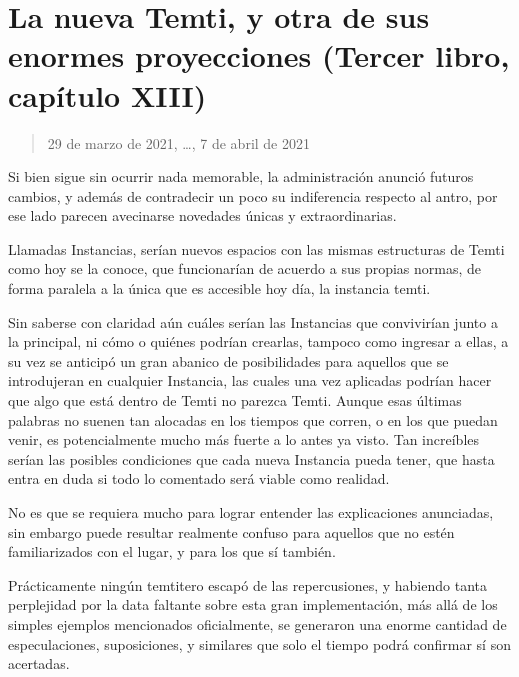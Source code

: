 \documentclass[
]{book}
\begin{document}
\hypertarget{la-nueva-temti-y-otra-de-sus-enormes-proyecciones-tercer-libro-capuxedtulo-xiii}{%
\section{La nueva Temti, y otra de sus enormes proyecciones (Tercer libro, capítulo XIII)}\label{la-nueva-temti-y-otra-de-sus-enormes-proyecciones-tercer-libro-capuxedtulo-xiii}}

\begin{quote}
29 de marzo de 2021, \ldots, 7 de abril de 2021
\end{quote}

Si bien sigue sin ocurrir nada memorable, la administración anunció futuros cambios, y además de contradecir un poco su indiferencia respecto al antro, por ese lado parecen avecinarse novedades únicas y extraordinarias.

Llamadas Instancias, serían nuevos espacios con las mismas estructuras de Temti como hoy se la conoce, que funcionarían de acuerdo a sus propias normas, de forma paralela a la única que es accesible hoy día, la instancia temti.

Sin saberse con claridad aún cuáles serían las Instancias que convivirían junto a la principal, ni cómo o quiénes podrían crearlas, tampoco como ingresar a ellas, a su vez se anticipó un gran abanico de posibilidades para aquellos que se introdujeran en cualquier Instancia, las cuales una vez aplicadas podrían hacer que algo que está dentro de Temti no parezca Temti. Aunque esas últimas palabras no suenen tan alocadas en los tiempos que corren, o en los que puedan venir, es potencialmente mucho más fuerte a lo antes ya visto. Tan increíbles serían las posibles condiciones que cada nueva Instancia pueda tener, que hasta entra en duda si todo lo comentado será viable como realidad.

No es que se requiera mucho para lograr entender las explicaciones anunciadas, sin embargo puede resultar realmente confuso para aquellos que no estén familiarizados con el lugar, y para los que sí también.

Prácticamente ningún temtitero escapó de las repercusiones, y habiendo tanta perplejidad por la data faltante sobre esta gran implementación, más allá de los simples ejemplos mencionados oficialmente, se generaron una enorme cantidad de especulaciones, suposiciones, y similares que solo el tiempo podrá confirmar sí son acertadas.
\end{document}

